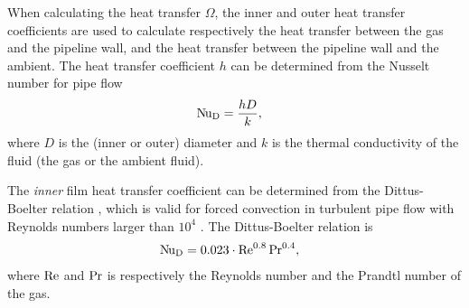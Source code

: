 When calculating the heat transfer $\Omega$, the inner and outer heat transfer coefficients are used to calculate respectively the heat transfer between the gas and the pipeline wall, and the heat transfer between the pipeline wall and the ambient. The heat transfer coefficient $h$ can be determined from the Nusselt number for pipe flow
\begin{align}
    &\operatorname{N\kern-.09em u}_\mathrm{D} = \frac{hD}{k}
,
\end{align}
where $D$ is the (inner or outer) diameter and $k$ is the thermal conductivity of the fluid (the gas or the ambient fluid).

The \emph{inner} film heat transfer coefficient can be determined from the Dittus-Boelter relation \cite{Winterton1998Where,Dittus1985Heat}, which is valid for forced convection in turbulent pipe flow with Reynolds numbers larger than $10^4$ \cite{Bergman2011Fundamentals}. The Dittus-Boelter relation is
\begin{align}
    &\operatorname{N\kern-.09em u}_\mathrm{D} = 0.023\cdot\operatorname{R\kern-.04em e}^{0.8}\operatorname{P\kern-.03em r}^{0.4},
\end{align}
where $\operatorname{R\kern-.04em e}$ and $\operatorname{P\kern-.03em r}$ is respectively the Reynolds number and the Prandtl number of the gas.

